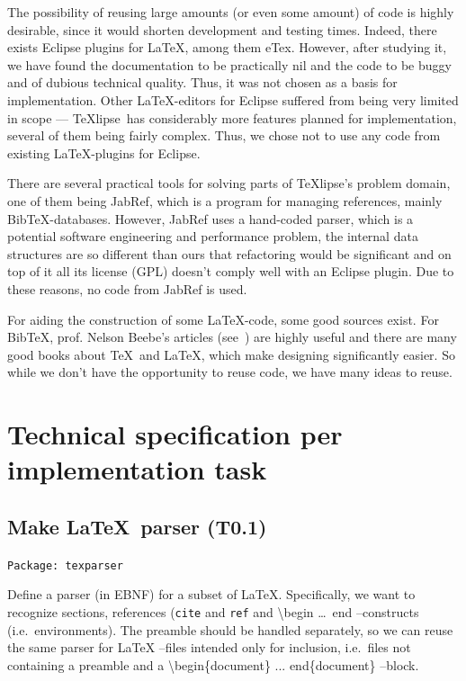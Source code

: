 \documentclass[a4paper,11pt,twoside]{article}
\newcommand{\texlipse}{\TeX lipse}
\begin{document}
The possibility of reusing large amounts (or even some amount) of code is 
highly desirable, since it would shorten development and testing times.  
Indeed, there exists Eclipse plugins for \LaTeX , among them eTex. However, 
after studying it, we have found the documentation to be practically nil and 
the code to be buggy and of dubious technical quality. Thus, it was not chosen 
as a basis for implementation. Other \LaTeX -editors for Eclipse suffered from 
being very limited in scope --- \texlipse\ has considerably more features 
planned for implementation, several of them being fairly complex. Thus, we 
chose not to use any code from existing \LaTeX -plugins for Eclipse.

There are several practical tools for solving parts of \texlipse's problem 
domain, one of them being JabRef, which is a program for managing references, 
mainly Bib\TeX -databases. However, JabRef uses a hand-coded parser, which is a 
potential software engineering and performance problem, the internal data 
structures are so different than ours that refactoring would be significant and 
on top of it all its license (GPL) doesn't comply well with an Eclipse plugin. 
Due to these reasons, no code from JabRef is used.

For aiding the construction of some \LaTeX -code, some good sources exist.
For Bib\TeX , prof. Nelson Beebe's articles
(see~\cite{Beebe:TB14-4-395-419}) are highly useful and there are many
good books about \TeX\ and \LaTeX , which make designing significantly
easier. So while we don't have the opportunity to reuse code, we have
many ideas to reuse.


\section{Technical specification per implementation task}
\label{sect:techntasks}

\subsection{Make \LaTeX\ parser (T0.1)}
\label{sect:t0.1}

\texttt{Package: texparser}

Define a parser (in EBNF) for a subset of \LaTeX. Specifically, we want to 
recognize sections, references (\texttt{cite} and \texttt{ref} and 
\textbackslash begin \ldots\ end --constructs (i.e.\ environments). The preamble 
should be handled separately, so we can reuse the same parser for \LaTeX 
--files intended only for inclusion, i.e.\ files not containing a preamble and a 
\textbackslash begin\{document\} ... end\{document\} --block.
\end{document}
